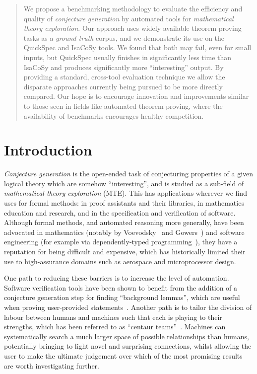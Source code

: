 \begin{abstract}
  We propose a benchmarking methodology to evaluate the efficiency and quality
  of \emph{conjecture generation} by automated tools for \emph{mathematical
    theory exploration}. Our approach uses widely available theorem proving
  tasks as a \emph{ground-truth} corpus, and we demonstrate its use on the
  QuickSpec and IsaCoSy tools. We found that both may fail, even for small
  inputs, but QuickSpec usually finishes in significantly less time than IsaCoSy
  and produces significantly more ``interesting'' output. By providing a
  standard, cross-tool evaluation technique we allow the disparate approaches
  currently being pursued to be more directly compared. Our hope is to encourage
  innovation and improvements similar to those seen in fields like automated
  theorem proving, where the availability of benchmarks encourages healthy
  competition.
\end{abstract}

\section{Introduction}
\label{intro}


\emph{Conjecture generation} is the open-ended task of conjecturing properties
of a given logical theory which are somehow ``interesting'', and is
studied as a sub-field of \emph{mathematical theory exploration} (MTE). This has
applications wherever we find uses for formal methods: in proof assistants and
their libraries, in mathematics education and research, and in the specification
and verification of software. Although formal methods, and automated reasoning
more generally, have been advocated in mathematics (notably by
Voevodsky~\cite{voevodsky2010univalent} and Gowers~\cite{ganesalingam2013fully})
and software engineering (for example via dependently-typed
programming~\cite{McKinna:2006}), they have a reputation for being difficult and
expensive, which has historically limited their use to high-assurance domains
such as aerospace and microprocessor design.

One path to reducing these barriers is to increase the level of automation.
Software verification tools have been shown to benefit from the addition of a
conjecture generation step for finding ``background lemmas'', which are useful
when proving user-provided statements~\cite{Claessen.Johansson.Rosen.ea:2013}.
Another path is to tailor the division of labour between humans and machines
such that each is playing to their strengths, which has been referred to as
``centaur teams''~\cite{harari2017reboot,davenport2015beyond}. Machines can
systematically search a much larger space of possible relationships than humans,
potentially bringing to light novel and surprising connections, whilst allowing
the user to make the ultimate judgement over which of the most promising results
are worth investigating further.

